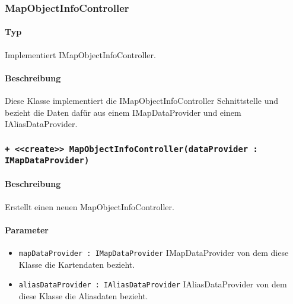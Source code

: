 \subsubsection{MapObjectInfoController}
\paragraph*{Typ}
Implementiert IMapObjectInfoController.
\paragraph*{Beschreibung}
Diese Klasse implementiert die IMapObjectInfoController Schnittstelle und bezieht die Daten 
dafür aus einem IMapDataProvider und einem IAliasDataProvider.

\subsubsection*{\texttt{+ <<create>> MapObjectInfoController(dataProvider : IMapDataProvider)}}%
\paragraph*{Beschreibung}
Erstellt einen neuen MapObjectInfoController.
\paragraph*{Parameter}
\begin{itemize}
    \item \texttt{mapDataProvider : IMapDataProvider} IMapDataProvider von dem diese Klasse die Kartendaten bezieht.
    \item \texttt{aliasDataProvider : IAliasDataProvider} IAliasDataProvider von dem diese Klasse die Aliasdaten bezieht.
\end{itemize}
